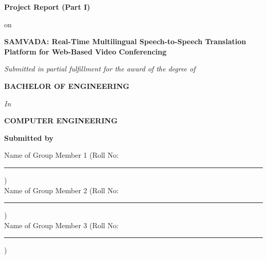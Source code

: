 \documentclass[12pt,a4paper]{report}
\begin{document}
\begin{titlepage}
\begin{center}

\vspace*{2.0cm} %

\vspace{0.8cm}
{\fontsize{14}{18}\selectfont \textbf{Project Report (Part I)}\par}
{\fontsize{14}{18}\selectfont on\par}
\vspace{0.8cm}

{\fontsize{22}{26}\selectfont \textbf{SAMVADA: Real-Time Multilingual Speech-to-Speech Translation Platform for Web-Based Video Conferencing}\par}

\vspace{1.0cm}
{\fontsize{12}{16}\selectfont \textit{Submitted in partial fulfillment for the award of the degree of}\par}
\vspace{0.2cm}
{\fontsize{16}{20}\selectfont \textbf{BACHELOR OF ENGINEERING}\par}
\vspace{0.1cm}
{\fontsize{12}{16}\selectfont \textit{In}\par}
\vspace{0.1cm}
{\fontsize{16}{20}\selectfont \textbf{COMPUTER ENGINEERING}\par}

\vspace{1.0cm}
{\fontsize{12}{16}\selectfont \textbf{Submitted by}\par}
\vspace{0.2cm}
{\fontsize{12}{16}\selectfont
Name of Group Member 1 (Roll No: \rule{3cm}{0.4pt})\\
Name of Group Member 2 (Roll No: \rule{3cm}{0.4pt})\\
Name of Group Member 3 (Roll No: \rule{3cm}{0.4pt})\par}


\end{center}
\end{titlepage}
\end{document}
